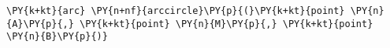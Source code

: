 \begin{Verbatim}[commandchars=\\\{\}]
    \PY{k+kt}{arc} \PY{n+nf}{arccircle}\PY{p}{(}\PY{k+kt}{point} \PY{n}{A}\PY{p}{,} \PY{k+kt}{point} \PY{n}{M}\PY{p}{,} \PY{k+kt}{point} \PY{n}{B}\PY{p}{)}
\end{Verbatim}
